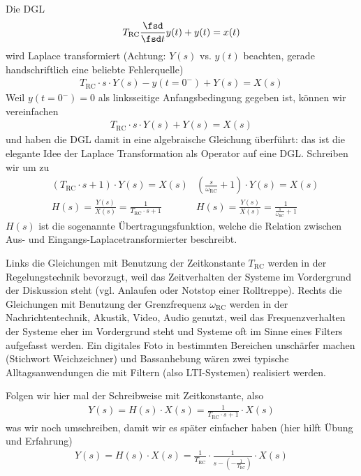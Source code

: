 \begin{ExCalc}
Die DGL
\begin{align}
T_\mathrm{RC}\frac{\fsd}{\fsd t} y(t) + y(t) = x(t)\\
\end{align}
wird Laplace transformiert (Achtung: $Y(s)$ vs. $y(t)$ beachten,
gerade handschriftlich eine beliebte Fehlerquelle)
\begin{align}
T_\mathrm{RC} \cdot s \cdot Y(s) - y(t=0^-) + Y(s) = X(s)
\end{align}
Weil $y(t=0^-)=0$ als linksseitige Anfangsbedingung gegeben ist, können wir vereinfachen
\begin{align}
T_\mathrm{RC} \cdot s \cdot Y(s) + Y(s) = X(s)
\end{align}
und haben die DGL damit in eine algebraische Gleichung überführt: das ist die
elegante Idee der Laplace Transformation als Operator auf eine DGL.
%
Schreiben wir um zu
\begin{align}
&(T_\mathrm{RC} \cdot s + 1 ) \cdot Y(s) = X(s)
& (\frac{s}{\omega_\mathrm{RC}} + 1 ) \cdot Y(s) = X(s) \\
&H(s) = \frac{Y(s)}{X(s)} = \frac{1}{T_\mathrm{RC} \cdot s + 1}
&H(s) = \frac{Y(s)}{X(s)} = \frac{1}{\frac{s}{\omega_\mathrm{RC}} + 1}
\end{align}
%
$H(s)$ ist die sogenannte Übertragungsfunktion, welche
die Relation zwischen Aus- und Eingangs-Laplacetransformierter beschreibt.

Links die Gleichungen mit Benutzung der Zeitkonstante $T_\mathrm{RC}$ werden in der
Regelungstechnik bevorzugt, weil das Zeitverhalten der Systeme im Vordergrund
der Diskussion steht (vgl. Anlaufen oder Notstop einer Rolltreppe).
%
Rechts die Gleichungen mit Benutzung der Grenzfrequenz $\omega_\mathrm{RC}$ werden
in der Nachrichtentechnik, Akustik, Video, Audio genutzt, weil das Frequenzverhalten
der Systeme eher im Vordergrund steht und Systeme oft im Sinne eines Filters
aufgefasst werden. Ein digitales Foto in bestimmten Bereichen unschärfer machen
(Stichwort Weichzeichner) und
Bassanhebung wären zwei typische Alltagsanwendungen die mit Filtern
(also LTI-Systemen) realisiert werden.

Folgen wir hier mal der Schreibweise mit Zeitkonstante, also
\begin{align}
Y(s) = H(s) \cdot X(s) = \frac{1}{T_\mathrm{RC} \cdot s + 1} \cdot X(s)
\end{align}
was wir noch umschreiben, damit wir es später einfacher haben (hier hilft Übung und Erfahrung)
\begin{align}
Y(s) = H(s) \cdot X(s) = \frac{1}{T_\mathrm{RC}} \cdot \frac{1}{s - (-\frac{1}{T_\mathrm{RC}})} \cdot X(s)
\end{align}


\end{ExCalc}
